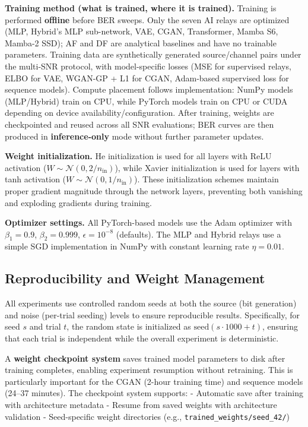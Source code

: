 \textbf{Training method (what is trained, where it is trained).} Training is performed \textbf{offline} before BER sweeps. Only the seven AI relays are optimized (MLP, Hybrid's MLP sub-network, VAE, CGAN, Transformer, Mamba S6, Mamba-2 SSD); AF and DF are analytical baselines and have no trainable parameters. Training data are synthetically generated source/channel pairs under the multi-SNR protocol, with model-specific losses (MSE for supervised relays, ELBO for VAE, WGAN-GP + L1 for CGAN, Adam-based supervised loss for sequence models). Compute placement follows implementation: NumPy models (MLP/Hybrid) train on CPU, while PyTorch models train on CPU or CUDA depending on device availability/configuration. After training, weights are checkpointed and reused across all SNR evaluations; BER curves are then produced in \textbf{inference-only} mode without further parameter updates.

\textbf{Weight initialization.} He initialization \cite{He2015DelvingRectifiers} is used for all layers with ReLU activation (\(W \sim \mathcal{N}(0, 2/n_{\text{in}})\)), while Xavier initialization is used for layers with tanh activation (\(W \sim \mathcal{N}(0, 1/n_{\text{in}})\)). These initialization schemes maintain proper gradient magnitude through the network layers, preventing both vanishing and exploding gradients during training.

\textbf{Optimizer settings.} All PyTorch-based models use the Adam optimizer with \(\beta_1 = 0.9\), \(\beta_2 = 0.999\), \(\epsilon = 10^{-8}\) (defaults). The MLP and Hybrid relays use a simple SGD implementation in NumPy with constant learning rate \(\eta = 0.01\).

\subsection{Reproducibility and Weight Management}\label{sec:reproducibility-and-weight-management}

All experiments use controlled random seeds at both the source (bit generation) and noise (per-trial seeding) levels to ensure reproducible results. Specifically, for seed \(s\) and trial \(t\), the random state is initialized as \(\text{seed}(s \cdot 1000 + t)\), ensuring that each trial is independent while the overall experiment is deterministic.

A \textbf{weight checkpoint system} saves trained model parameters to disk after training completes, enabling experiment resumption without retraining. This is particularly important for the CGAN (2-hour training time) and sequence models (24--37 minutes). The checkpoint system supports: - Automatic save after training with architecture metadata - Resume from saved weights with architecture validation - Seed-specific weight directories (e.g., \texttt{trained\_weights/seed\_42/})

